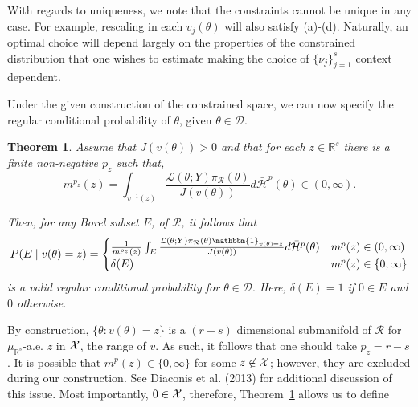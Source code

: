 \documentclass[10pt,fleqn]{article} \pdfoutput=1
\newtheorem{theorem}{Theorem} \newtheorem{lemma}{Lemma}
\DeclareMathOperator{\1}{\mathbbm{1}} \DeclareMathOperator{\bigO}{\mc O}
\begin{document}

With regards to uniqueness, we note that the constraints cannot be unique
in any case.  For example, rescaling in each $v_j(\theta)$ will also satisfy (a)-(d). Naturally, an optimal choice will depend largely on the properties of the
constrained distribution that one wishes to estimate making the choice of
$\{\nu_j\}_{j=1}^s$ context dependent.

Under the given construction of the constrained space, we can now specify
the regular conditional probability of $\theta$, given $\theta \in
	\mathcal{D}.$ 

	\begin{theorem}\citep{diaconis2013manifold}
	\label{THM:RCP_construction} Assume that $J(v(\theta)) > 0$ and
	that for each $z\in\mathbb{R}^s$ there is a finite non-negative
	 $p_z$ such that,  $$m^{p_z}(z) = \int_{v^{-1}(z)}
		\frac{\mathcal{L}(\theta; Y) \pi_\mathcal{R}(\theta)}
			{J(v(\theta))} d\bar{\mathcal{H}}^{p}(\theta)
		\in (0,\infty).$$ 

		Then, for any Borel subset $E$, of
	$\mathcal{R}$, it follows that $$P(E \mid v(\theta) = z) = \begin{cases}
			\frac{1}{m^{p_z}(z)} \int_E \frac{\mathcal{L}(\theta; Y)
				\pi_\mathcal{R}(\theta)
				\mathbbm{1}_{v(\theta)=z}}{J(v(\theta))} d\bar{\mathcal{H}}^{p}(\theta)
			 & m^p(z)\in (0,\infty) \\ \delta (E) & m^p(z) \in \{0,\infty\}
		\end{cases}$$ 
		is a valid regular conditional probability for
	$\theta\in\mathcal{D}.$ Here, $\delta (E)=1$ if $0\in E$ and $0$ otherwise.
\end{theorem}

By construction, $\{\theta:v(\theta)=z\}$ is a $(r-s)$ dimensional
submanifold of $\mathcal{R}$ for $\mu_{\mathbb{R}^s}$-a.e. $z$ in $\mathcal{X}$, the range
of $v$. As such, it follows that one should take $p_z=r-s$. It is possible that
$m^p(z)\in\{0,\infty\}$ for some $z\not\in \mathcal{X}$; however, they are excluded during our construction. See Diaconis et al. (2013)
for additional discussion of this issue. Most importantly, $0\in \mathcal{X}$, therefore, Theorem~\ref{THM:RCP_construction} allows us to define
\end{document}
